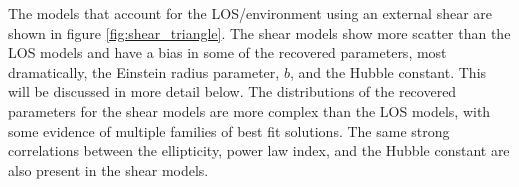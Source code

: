 The models that account for the LOS/environment using an external shear are shown in figure \ref{fig:shear_triangle}. The shear models show more scatter than the LOS models and have a bias in some of the recovered parameters, most dramatically, the Einstein radius parameter, $b$, and the Hubble constant. This will be discussed in more detail below. The distributions of the recovered parameters for the shear models are more complex than the LOS models, with some evidence of multiple families of best fit solutions. The same strong correlations between the ellipticity, power law index, and the Hubble constant are also present in the shear models. 